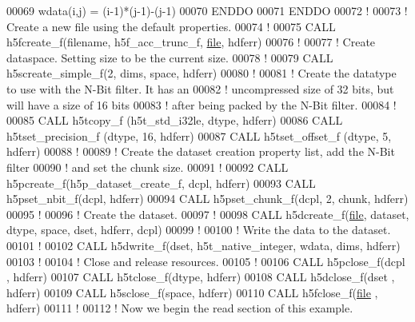 \begin{DoxyCode}
00069         wdata(i,j) = (i-1)*(j-1)-(j-1)
00070 \textcolor{keywordflow}{     ENDDO}
00071 \textcolor{keywordflow}{  ENDDO}
00072   \textcolor{comment}{!    }
00073   \textcolor{comment}{! Create a new file using the default properties.}
00074   \textcolor{comment}{!}
00075   \textcolor{keyword}{CALL }h5fcreate\_f(filename, h5f\_acc\_trunc\_f, \hyperlink{structfile}{file}, hdferr)
00076   \textcolor{comment}{!}
00077   \textcolor{comment}{! Create dataspace.  Setting size to be the current size.}
00078   \textcolor{comment}{!}
00079   \textcolor{keyword}{CALL }h5screate\_simple\_f(2, dims, space, hdferr)
00080   \textcolor{comment}{!}
00081   \textcolor{comment}{! Create the datatype to use with the N-Bit filter.  It has an}
00082   \textcolor{comment}{! uncompressed size of 32 bits, but will have a size of 16 bits}
00083   \textcolor{comment}{! after being packed by the N-Bit filter.}
00084   \textcolor{comment}{!}
00085   \textcolor{keyword}{CALL }h5tcopy\_f (h5t\_std\_i32le, dtype, hdferr)
00086   \textcolor{keyword}{CALL }h5tset\_precision\_f (dtype, 16, hdferr)
00087   \textcolor{keyword}{CALL }h5tset\_offset\_f (dtype, 5, hdferr)
00088   \textcolor{comment}{!}
00089   \textcolor{comment}{! Create the dataset creation property list, add the N-Bit filter}
00090   \textcolor{comment}{! and set the chunk size.}
00091   \textcolor{comment}{!}
00092   \textcolor{keyword}{CALL }h5pcreate\_f(h5p\_dataset\_create\_f, dcpl, hdferr)
00093   \textcolor{keyword}{CALL }h5pset\_nbit\_f(dcpl, hdferr)
00094   \textcolor{keyword}{CALL }h5pset\_chunk\_f(dcpl, 2, chunk, hdferr)
00095   \textcolor{comment}{!}
00096   \textcolor{comment}{! Create the dataset.}
00097   \textcolor{comment}{!}
00098   \textcolor{keyword}{CALL }h5dcreate\_f(\hyperlink{structfile}{file}, dataset, dtype, space, dset, hdferr, dcpl)
00099   \textcolor{comment}{!}
00100   \textcolor{comment}{! Write the data to the dataset.}
00101   \textcolor{comment}{!}
00102   \textcolor{keyword}{CALL }h5dwrite\_f(dset, h5t\_native\_integer, wdata, dims, hdferr)
00103   \textcolor{comment}{!}
00104   \textcolor{comment}{! Close and release resources.}
00105   \textcolor{comment}{!}
00106   \textcolor{keyword}{CALL }h5pclose\_f(dcpl , hdferr)
00107   \textcolor{keyword}{CALL }h5tclose\_f(dtype, hdferr)
00108   \textcolor{keyword}{CALL }h5dclose\_f(dset , hdferr)
00109   \textcolor{keyword}{CALL }h5sclose\_f(space, hdferr)
00110   \textcolor{keyword}{CALL }h5fclose\_f(\hyperlink{structfile}{file} , hdferr)
00111   \textcolor{comment}{!}
00112   \textcolor{comment}{! Now we begin the read section of this example.}

\end{DoxyCode}
